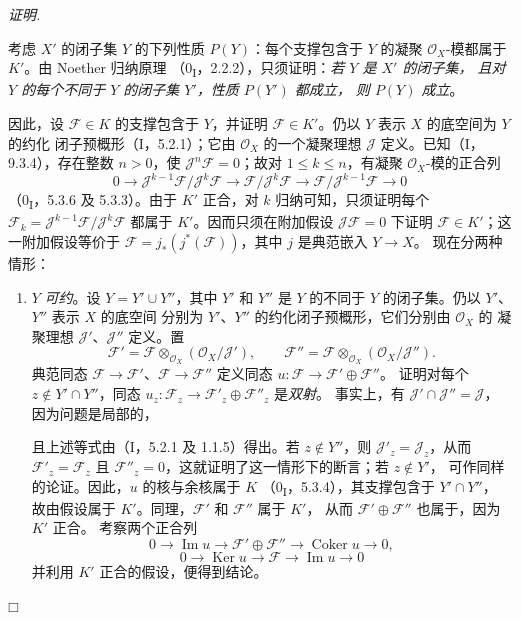 \documentclass[UTF8,fontset=none,11pt,oneside,openany]{ctexbook}
\providecommand{\square}{\mdlgwhtsquare}
\newenvironment{proof}{%
  \par\smallskip\noindent\textit{证明.}\ %
}{\hfill$\square$\par}
\newcommand{\oldpage}[2][]{%
  \hypertarget{ega-source-page-#1-#2}{}%
  \marginnote{\scriptsize\textbf{#1}~|~#2}\ignorespaces}
\begin{document}
\begin{proof}
考虑 $X'$ 的闭子集 $Y$ 的下列性质 $P(Y)$：每个支撑包含于 $Y$
的凝聚 $\mathcal O_X$-模都属于 $K'$。由 Noether 归纳原理
（0\textsubscript{I}，2.2.2），只须证明：\emph{若 $Y$ 是 $X'$ 的闭子集，
且对 $Y$ 的每个不同于 $Y$ 的闭子集 $Y'$，性质 $P(Y')$ 都成立，
则 $P(Y)$ 成立}。

因此，设 $\mathcal F\in K$ 的支撑包含于 $Y$，并证明
$\mathcal F\in K'$。仍以 $Y$ 表示 $X$ 的底空间为 $Y$ 的约化
闭子预概形（I，5.2.1）；它由 $\mathcal O_X$ 的一个凝聚理想
$\mathcal J$ 定义。已知（I，9.3.4），存在整数 $n>0$，使
$\mathcal J^n\mathcal F=0$；故对 $1\leq k\leq n$，有凝聚
$\mathcal O_X$-模的正合列
\[
0\longrightarrow
\mathcal J^{k-1}\mathcal F/\mathcal J^k\mathcal F
\longrightarrow \mathcal F/\mathcal J^k\mathcal F
\longrightarrow \mathcal F/\mathcal J^{k-1}\mathcal F
\longrightarrow0
\]
（0\textsubscript{I}，5.3.6 及 5.3.3）。由于 $K'$ 正合，对 $k$
归纳可知，只须证明每个
$\mathcal F_k=\mathcal J^{k-1}\mathcal F/\mathcal J^k\mathcal F$
都属于 $K'$。因而只须在附加假设 $\mathcal J\mathcal F=0$ 下证明
$\mathcal F\in K'$；这一附加假设等价于
$\mathcal F=j_*(j^*(\mathcal F))$，其中 $j$ 是典范嵌入 $Y\to X$。
现在分两种情形：
\begin{enumerate}
\item[a)] $Y$ \emph{可约}。设 $Y=Y'\cup Y''$，其中 $Y'$ 和 $Y''$
是 $Y$ 的不同于 $Y$ 的闭子集。仍以 $Y'$、$Y''$ 表示 $X$ 的底空间
分别为 $Y'$、$Y''$ 的约化闭子预概形，它们分别由 $\mathcal O_X$ 的
凝聚理想 $\mathcal J'$、$\mathcal J''$ 定义。置
\[
\mathcal F'=\mathcal F\otimes_{\mathcal O_X}
(\mathcal O_X/\mathcal J'),\qquad
\mathcal F''=\mathcal F\otimes_{\mathcal O_X}
(\mathcal O_X/\mathcal J'').
\]
典范同态 $\mathcal F\to\mathcal F'$、$\mathcal F\to\mathcal F''$
定义同态 $u:\mathcal F\to\mathcal F'\oplus\mathcal F''$。
证明对每个 $z\notin Y'\cap Y''$，同态
$u_z:\mathcal F_z\to\mathcal F'_z\oplus\mathcal F''_z$ 是\emph{双射}。
事实上，有 $\mathcal J'\cap\mathcal J''=\mathcal J$，因为问题是局部的，

\oldpage[III]{116}
且上述等式由（I，5.2.1 及 1.1.5）得出。若 $z\notin Y''$，则
$\mathcal J'_z=\mathcal J_z$，从而 $\mathcal F'_z=\mathcal F_z$ 且
$\mathcal F''_z=0$，这就证明了这一情形下的断言；若 $z\notin Y'$，
可作同样的论证。因此，$u$ 的核与余核属于 $K$
（0\textsubscript{I}，5.3.4），其支撑包含于 $Y'\cap Y''$，
故由假设属于 $K'$。同理，$\mathcal F'$ 和 $\mathcal F''$ 属于 $K'$，
从而 $\mathcal F'\oplus\mathcal F''$ 也属于，因为 $K'$ 正合。
考察两个正合列
\[
0\longrightarrow\operatorname{Im}u\longrightarrow
\mathcal F'\oplus\mathcal F''\longrightarrow
\operatorname{Coker}u\longrightarrow0,
\]
\[
0\longrightarrow\operatorname{Ker}u\longrightarrow\mathcal F
\longrightarrow\operatorname{Im}u\longrightarrow0
\]
并利用 $K'$ 正合的假设，便得到结论。


\end{enumerate}
\end{proof}
\end{document}
